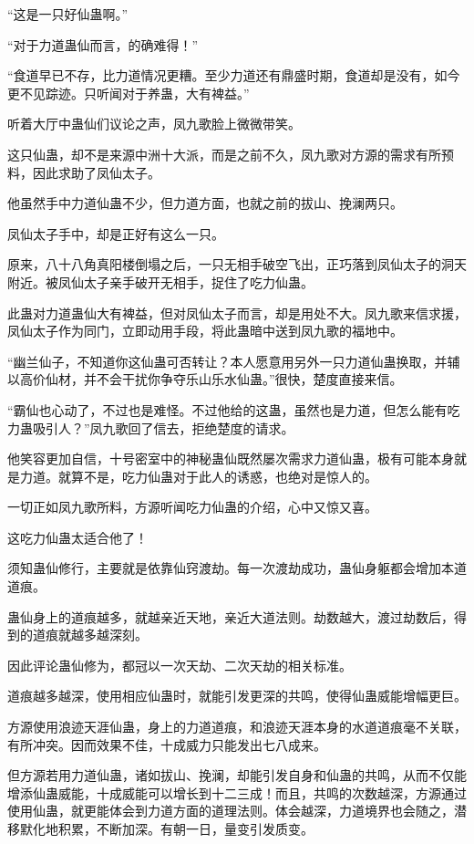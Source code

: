 \begin{this_body}
“这是一只好仙蛊啊。”

“对于力道蛊仙而言，的确难得！”

“食道早已不存，比力道情况更糟。至少力道还有鼎盛时期，食道却是没有，如今更不见踪迹。只听闻对于养蛊，大有裨益。”

听着大厅中蛊仙们议论之声，凤九歌脸上微微带笑。

这只仙蛊，却不是来源中洲十大派，而是之前不久，凤九歌对方源的需求有所预料，因此求助了凤仙太子。

他虽然手中力道仙蛊不少，但力道方面，也就之前的拔山、挽澜两只。

凤仙太子手中，却是正好有这么一只。

原来，八十八角真阳楼倒塌之后，一只无相手破空飞出，正巧落到凤仙太子的洞天附近。被凤仙太子亲手破开无相手，捉住了吃力仙蛊。

此蛊对力道蛊仙大有裨益，但对凤仙太子而言，却是用处不大。凤九歌来信求援，凤仙太子作为同门，立即动用手段，将此蛊暗中送到凤九歌的福地中。

“幽兰仙子，不知道你这仙蛊可否转让？本人愿意用另外一只力道仙蛊换取，并辅以高价仙材，并不会干扰你争夺乐山乐水仙蛊。”很快，楚度直接来信。

“霸仙也心动了，不过也是难怪。不过他给的这蛊，虽然也是力道，但怎么能有吃力蛊吸引人？”凤九歌回了信去，拒绝楚度的请求。

他笑容更加自信，十号密室中的神秘蛊仙既然屡次需求力道仙蛊，极有可能本身就是力道。就算不是，吃力仙蛊对于此人的诱惑，也绝对是惊人的。

一切正如凤九歌所料，方源听闻吃力仙蛊的介绍，心中又惊又喜。

这吃力仙蛊太适合他了！

须知蛊仙修行，主要就是依靠仙窍渡劫。每一次渡劫成功，蛊仙身躯都会增加本道道痕。

蛊仙身上的道痕越多，就越亲近天地，亲近大道法则。劫数越大，渡过劫数后，得到的道痕就越多越深刻。

因此评论蛊仙修为，都冠以一次天劫、二次天劫的相关标准。

道痕越多越深，使用相应仙蛊时，就能引发更深的共鸣，使得仙蛊威能增幅更巨。

方源使用浪迹天涯仙蛊，身上的力道道痕，和浪迹天涯本身的水道道痕毫不关联，有所冲突。因而效果不佳，十成威力只能发出七八成来。

但方源若用力道仙蛊，诸如拔山、挽澜，却能引发自身和仙蛊的共鸣，从而不仅能增添仙蛊威能，十成威能可以增长到十二三成！而且，共鸣的次数越深，方源通过使用仙蛊，就更能体会到力道方面的道理法则。体会越深，力道境界也会随之，潜移默化地积累，不断加深。有朝一日，量变引发质变。


\end{this_body}
